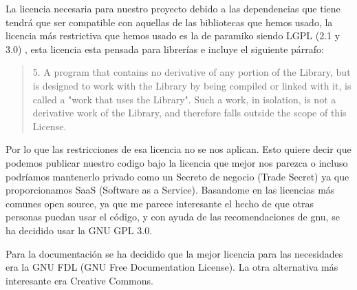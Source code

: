 La licencia necesaria para nuestro proyecto debido a las dependencias que tiene tendrá que ser compatible con aquellas de las bibliotecas que hemos usado, la licencia más restrictiva que hemos usado es la de paramiko siendo LGPL (2.1 y 3.0)\cite{LGPL} , esta licencia esta pensada para librerías e incluye el siguiente párrafo:

\begin{quotation}5. A program that contains no derivative of any portion of the Library, but is designed to work with the Library by being compiled or linked with it, is called a "work that uses the Library". Such a work, in isolation, is not a derivative work of the Library, and therefore falls outside the scope of this License.
\end{quotation}

Por lo que las restricciones de esa licencia no se nos aplican. Esto quiere decir que podemos publicar nuestro codigo bajo la licencia que mejor nos parezca o incluso podríamos mantenerlo privado como un Secreto de negocio (Trade Secret) ya que proporcionamos SaaS (Software as a Service). Basandome en las licencias más comunes open source, ya que me parece interesante el hecho de que otras personas puedan usar el código, y con ayuda de las recomendaciones de gnu\cite{gnurecs}, se ha decidido usar la GNU GPL 3.0.

Para la documentación se ha decidido que la mejor licencia para las necesidades era la GNU FDL (GNU Free Documentation License). La otra alternativa más interesante era Creative Commons.
